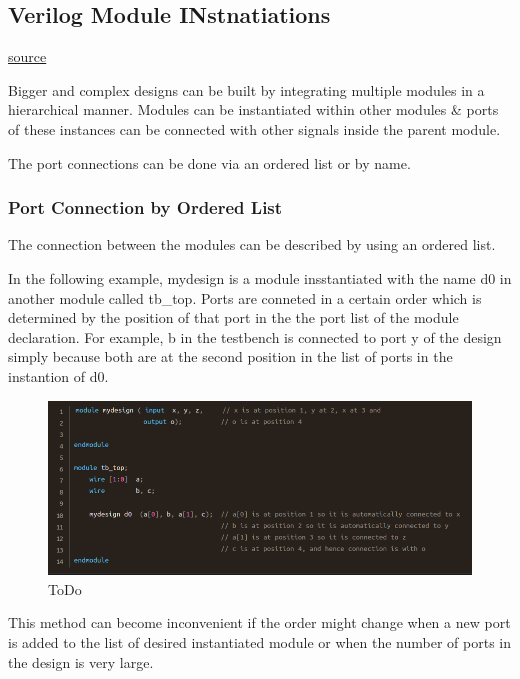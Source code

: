 \documentclass{article}
\begin{document}
	\subsection{Verilog Module INstnatiations}

	\href{https://www.chipverify.com/verilog/verilog-module-instantiations}{source}

	Bigger and complex designs can be built by integrating multiple modules in a hierarchical manner. Modules can be instantiated within other modules \& ports of these instances can be connected
	with other signals inside the parent module. \newline

	The port connections can be done via an ordered list or by name. \newline

	\subsubsection{Port Connection by Ordered List}

	The connection between the modules can be described by using an ordered list. \newline

	In the following example, mydesign is a module insstantiated with the name d0 in another module called tb\_top. Ports are conneted in a certain order which is determined by the position of that port
	in the the port list of the module declaration. For example, b in the testbench is connected to port y of the design simply because both are at the second position in the list of ports in the 
	instantion of d0.

	\begin{figure}[H]
		\includegraphics[width=\linewidth]{VerilogPics/figure_32.png}
		\caption{ToDo}
		\label{ToDo}
	\end{figure}

	This method can become inconvenient if the order might change when a new port is added to the list of desired instantiated module or when the number of ports in the design is very large.
\end{document}
